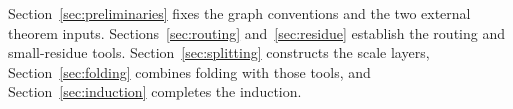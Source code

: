 \documentclass[11pt]{article}
\numberwithin{equation}{section}
\theoremstyle{definition}
\theoremstyle{remark}
\begin{document}
Section~\ref{sec:preliminaries} fixes the graph conventions and the two
external theorem inputs. Sections~\ref{sec:routing} and~\ref{sec:residue}
establish the routing
and small-residue tools. Section~\ref{sec:splitting} constructs the
scale layers, Section~\ref{sec:folding} combines folding with those
tools, and Section~\ref{sec:induction} completes the induction.










\end{document}

